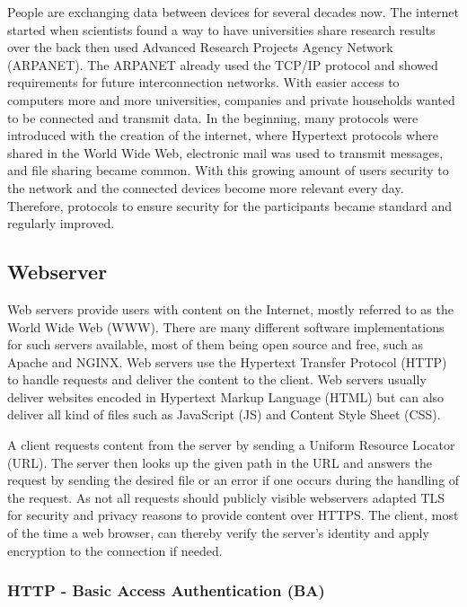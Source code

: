 People are exchanging data between devices for several decades now. The internet
started when scientists found a way to have universities share research results
over the back then used Advanced Research Projects Agency Network (ARPANET).
The ARPANET already used the TCP/IP protocol and showed requirements for future
interconnection networks. With easier access to computers more and more
universities, companies and private households wanted to be connected and
transmit data. In the beginning, many protocols were introduced with the
creation of the internet, where Hypertext protocols where shared in the World
Wide Web, electronic mail was used to transmit messages, and file sharing became
common. With this growing amount of users security to the network and the
connected devices become more relevant every day. Therefore, protocols to ensure
security for the participants became standard and regularly improved.

\subsection{Webserver}

Web servers provide users with content on the Internet, mostly referred to as
the World Wide Web (WWW). There are many different software implementations for
such servers available, most of them being open source and free, such as
Apache\cite{apacheweb} and NGINX\cite{nginxweb}. Web servers use the Hypertext
Transfer Protocol (HTTP) to handle requests and deliver the content to the
client. Web servers usually deliver websites encoded in Hypertext Markup
Language (HTML) but can also deliver all kind of files such as JavaScript (JS)
and Content Style Sheet (CSS).

A client requests content from the server by sending a Uniform Resource Locator
(URL). The server then looks up the given path in the URL and answers the
request by sending the desired file or an error if one occurs during the
handling of the request. As not all requests should publicly visible webservers
adapted TLS for security and privacy reasons to provide content over HTTPS. The
client, most of the time a web browser, can thereby verify the server's identity
and apply encryption to the connection if needed.

\subsubsection{HTTP - Basic Access Authentication (BA)}

